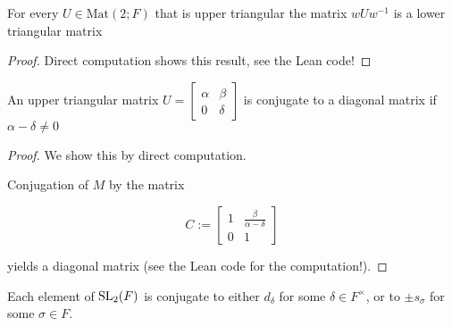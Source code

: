 \begin{corollary}
    \label{lower_triangular_isConj_upper_triangular}
    \leanok
    For every $U \in\textrm{Mat}(2; F)$ that is upper triangular the matrix $w U w^{-1}$ is a lower triangular matrix
\end{corollary}
\begin{proof}
    \leanok
    Direct computation shows this result, see the Lean code!
\end{proof}


\begin{lemma}
    \label{upper_triangular_isConj_diagonal_of_nonzero_det}
    \leanok
    An upper triangular matrix $U = \begin{bmatrix}
        \alpha & \beta\\
        0 & \delta
    \end{bmatrix}$ is conjugate to a diagonal matrix if $\alpha - \delta \ne 0$
\end{lemma}
\begin{proof}
    \leanok
We show this by direct computation.

Conjugation of $M$ by the matrix 

\[
C := \begin{bmatrix}
    1 & \frac{\beta}{\alpha - \delta}\\
    0 & 1
\end{bmatrix}
\]

yields a diagonal matrix (see the Lean code for the computation!).
\end{proof}




\begin{proposition}
\label{SL2_IsConj_d_or_IsConj_s_or_IsConj_neg_s_of_AlgClosed}
\leanok
    Each element of $\operatorname{SL}_2(F)$ is conjugate to either $d_\delta$ for some $\delta \in F^\times$, or to $\pm s_\sigma$ for some $\sigma \in F$.
\end{proposition}

